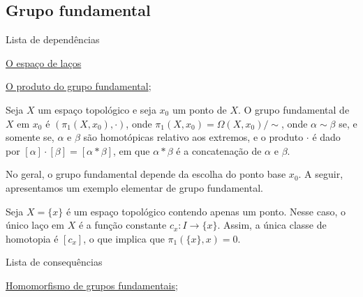 \subsection{Grupo fundamental}
\label{grupo-fundamental-def}
\begin{titlemize}{Lista de dependências}
	\item \hyperref[espaco-lacos-def]{O espaço de laços}
	\item \hyperref[produto-bem-definido-prop]{O produto do grupo fundamental};\\ %
\end{titlemize}
\begin{defi}
    Seja $X$ um espaço topológico e seja $x_0$ um ponto de $X.$ O grupo fundamental de $X$ em $x_0$ é $(\pi_1(X,x_0),\cdot)$, onde $\pi_1(X,x_0) = \Omega(X,x_0)/\sim$, onde $\alpha \sim \beta$ se, e somente se, $\alpha$ e $\beta$ são homotópicas relativo aos extremos, e o produto $\cdot$ é dado por $[\alpha]\cdot[\beta] = [\alpha \ast \beta]$, em que $\alpha \ast \beta$ é a concatenação de $\alpha$ e $\beta$.
\end{defi}

No geral, o grupo fundamental depende da escolha do ponto base $x_0$. A seguir, apresentamos um exemplo elementar de grupo fundamental.
\begin{ex}
    Seja $X=\{x\}$ é um espaço topológico contendo apenas um ponto. Nesse caso, o único laço em $X$ é a função constante $c_x:I\rightarrow \{x\}$. Assim, a única classe de homotopia é $[c_x]$, o que implica que $\pi_1(\{x\},x)=0$.
\end{ex}

\begin{titlemize}{Lista de consequências}
	\item \hyperref[hom-grupo-fundamental]{Homomorfismo de grupos fundamentais};%
\end{titlemize}
